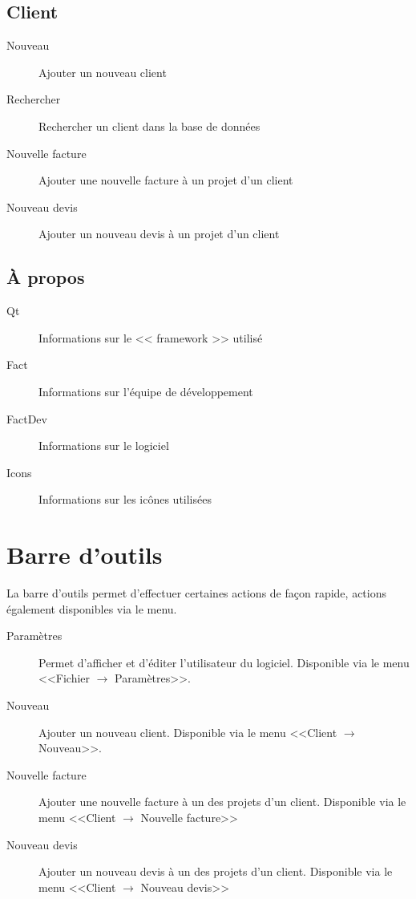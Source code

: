 \subsection{Client}
\begin{description}
	\item[Nouveau] Ajouter un nouveau client
	\item[Rechercher] Rechercher un client dans la base de données
	\item[Nouvelle facture]  Ajouter une nouvelle facture à un projet d’un client
	\item[Nouveau devis] Ajouter un nouveau devis à un projet d’un client
\end{description}
\subsection{À propos}
\begin{description}
	\item[Qt] Informations sur le << framework >> utilisé
	\item[Fact] Informations sur l'équipe de développement
	\item[FactDev]Informations sur le logiciel
	\item[Icons] Informations sur les icônes utilisées
\end{description}
\section{Barre d'outils}
La barre d’outils permet d’effectuer certaines actions de façon rapide, actions également disponibles via le menu.

\begin{description}
	\item[Paramètres] Permet d'afficher et d’éditer l'utilisateur du logiciel. Disponible via le menu <<Fichier $\rightarrow$ Paramètres>>.
	\item[Nouveau] Ajouter un nouveau client. Disponible via le menu <<Client $\rightarrow$ Nouveau>>.
	\item[Nouvelle facture]  Ajouter une nouvelle facture à un des projets d’un client. Disponible via le menu <<Client $\rightarrow$ Nouvelle facture>>
	\item[Nouveau devis] Ajouter un nouveau devis à un des projets d’un client. Disponible via le menu <<Client $\rightarrow$ Nouveau devis>>
\end{description}

